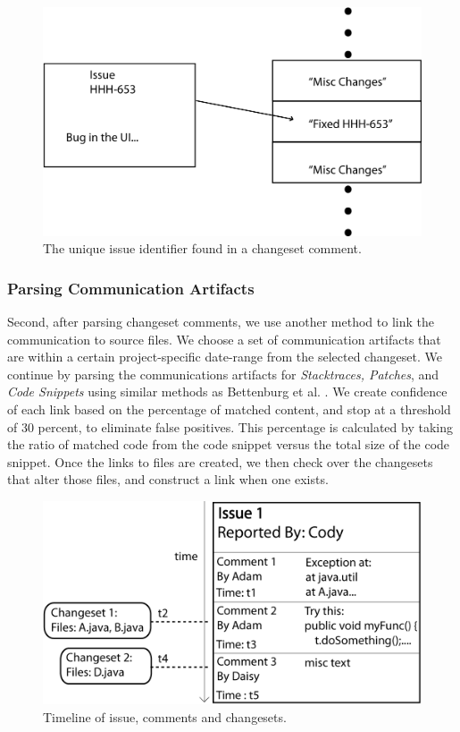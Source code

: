 \documentclass[conference]{IEEEtran}
\begin{document}
\begin{figure}[b!]
\centering
\includegraphics[width=1.0\columnwidth]{CommitsToChangesets1}
\caption{The unique issue identifier found in a changeset comment.\label{fig:identifier}}
\end{figure}

\subsubsection{Parsing Communication Artifacts}
Second, after parsing changeset comments, we use another method to link the communication to source files.  We choose a set of communication artifacts that are within a certain project-specific date-range from the selected changeset.  We continue by parsing the communications artifacts for \textit{Stacktraces, Patches}, and \textit{Code Snippets} using similar methods as Bettenburg et al. \cite{Bettenburg:2008:ESI:1370750.1370757}.  We create confidence of each link based on the percentage of matched content, and stop at a threshold of 30 percent, to eliminate false positives.  This percentage is calculated by taking the ratio of matched code from the code snippet versus the total size of the code snippet. Once the links to files are created, we then check over the changesets that alter those files, and construct a link when one exists.  

\begin{figure}[t!]
\centering
\includegraphics[width=1.0\columnwidth]{Items}
\caption{Timeline of issue, comments and changesets.\label{fig:items}}
\end{figure}
\end{document}

